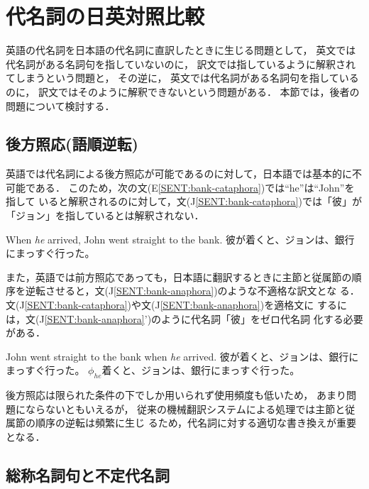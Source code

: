 \section{代名詞の日英対照比較}
\label{sec:problems}

英語の代名詞を日本語の代名詞に直訳したときに生じる問題として，
英文では代名詞がある名詞句を指していないのに，
訳文では指しているように解釈されてしまうという問題と，
その逆に，
英文では代名詞がある名詞句を指しているのに，
訳文ではそのように解釈できないという問題がある．
本節では，後者の問題について検討する．

\subsection{後方照応(語順逆転)}

英語では代名詞による後方照応が可能であるのに対して，日本語では基本的に不
可能である\cite{Kanzaki94}．
このため，次の文(E\ref{SENT:bank-cataphora})では``he''は``John''を指して
いると解釈されるのに対して，文(J\ref{SENT:bank-cataphora})では「彼」が
「ジョン」を指しているとは解釈されない．
\begin{SENT}
\sentE When {\it he} arrived, John went straight to the bank.
\sentJ 彼が着くと、ジョンは、銀行にまっすぐ行った。
\label{SENT:bank-cataphora}
\end{SENT}

また，英語では前方照応であっても，日本語に翻訳するときに主節と従属節の順
序を逆転させると，文(J\ref{SENT:bank-anaphora})のような不適格な訳文とな
る．
文(J\ref{SENT:bank-cataphora})や文(J\ref{SENT:bank-anaphora})を適格文に
するには，文(J\ref{SENT:bank-anaphora}')のように代名詞「彼」をゼロ代名詞
化する必要がある．
\begin{SENT2}
\sentE John went straight to the bank when {\it he} arrived.
\sentJ 彼が着くと、ジョンは、銀行にまっすぐ行った。
\NewsentJ $\phi_{he}$着くと、ジョンは、銀行にまっすぐ行った。
\label{SENT:bank-anaphora}
\end{SENT2}

後方照応は限られた条件の下でしか用いられず使用頻度も低いため，
あまり問題にならないともいえるが，
従来の機械翻訳システムによる処理では主節と従属節の順序の逆転は頻繁に生じ
るため，代名詞に対する適切な書き換えが重要となる．

\subsection{総称名詞句と不定代名詞}
\label{sec:problem:indef_pron}

